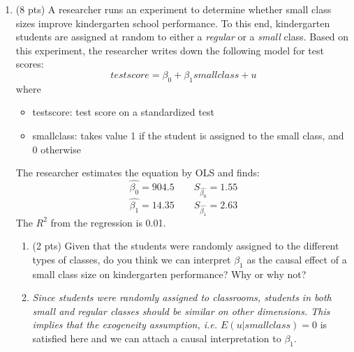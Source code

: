 \documentclass{./../../Latex/tests}
\begin{document}
\begin{enumerate}
\newpage 
\item (8 pts) A researcher runs an experiment to determine whether small class sizes improve kindergarten school performance. To this end, kindergarten students are assigned at random to either a \textit{regular} or a \textit{small} class. Based on this experiment, the researcher writes down the following model for test scores:
 $$ testscore = \beta_0 + \beta_1 smallclass + u $$
 where 
\begin{itemize}
  \item[] testscore: test score on a standardized test
  \item[] smallclass: takes value 1 if the student is assigned to the small class, and 0 otherwise
\end{itemize}
The researcher estimates the equation by OLS and finds:
$$ \hat{\beta_0} = 904.5 \quad \quad S_{\hat{\beta_0}} = 1.55 $$
$$ \hat{\beta_1} = 14.35 \quad \quad S_{\hat{\beta_1}} = 2.63 $$
The $R^2$ from the regression is 0.01. 

\begin{enumerate}
  \item (2 pts) Given that the students were randomly assigned to the different types of classes, do you think we can interpret $\beta_1$ as the causal effect of a small class size on kindergarten performance? Why or why not?

  \item[] \textit{Since students were randomly assigned to classrooms, students in both small and regular classes should be similar on other dimensions. This implies that the exogeneity assumption, i.e. $E(u|smallclass)=0$} is satisfied here and we can attach a causal interpretation to $\beta_1$. \\~\\


\end{enumerate}
\end{enumerate}
\end{document}
